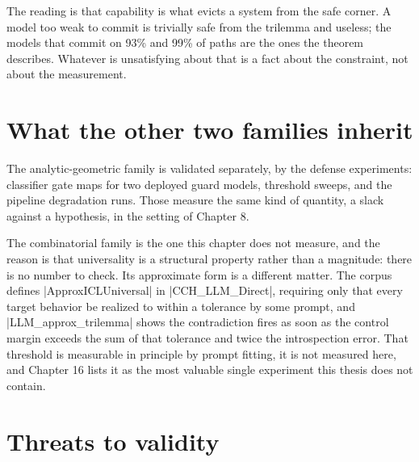 \documentclass{memoir}
\begin{document}
The reading is that capability is what evicts a system from the safe corner. A
model too weak to commit is trivially safe from the trilemma and useless; the
models that commit on 93\% and 99\% of paths are the ones the theorem describes.
Whatever is unsatisfying about that is a fact about the constraint, not about
the measurement.



\section{What the other two families inherit}\label{Two--Schemas--of--Impossibility-005F-005F-005F--Machine--Checked--Limits--of--Trustworthy--Machine--Learning-005F-005F-005F--and--Why--They--Tighten--with--Capability----Does--the--Constraint--Bind-005F-005F-005F--Measurements--on--Five--Models----What--the--other--two--families--inherit}

The analytic-geometric family is validated separately, by the defense
experiments: classifier gate maps for two deployed guard models, threshold
sweeps, and the pipeline degradation runs. Those measure the same kind of
quantity, a slack against a hypothesis, in the setting of Chapter 8.

The combinatorial family is the one this chapter does not measure, and the
reason is that universality is a structural property rather than a magnitude:
there is no number to check. Its approximate form is a different matter. The
corpus defines \LeanVerb|ApproxICLUniversal| in \LeanVerb|CCH_LLM_Direct|, requiring only that
every target behavior be realized to within a tolerance by some prompt, and
\LeanVerb|LLM_approx_trilemma| shows the contradiction fires as soon as the control
margin exceeds the sum of that tolerance and twice the introspection error. That
threshold is measurable in principle by prompt fitting, it is not measured here,
and Chapter 16 lists it as the most valuable single experiment this thesis does
not contain.



\section{Threats to validity}\label{Two--Schemas--of--Impossibility-005F-005F-005F--Machine--Checked--Limits--of--Trustworthy--Machine--Learning-005F-005F-005F--and--Why--They--Tighten--with--Capability----Does--the--Constraint--Bind-005F-005F-005F--Measurements--on--Five--Models----Threats--to--validity}
\end{document}
